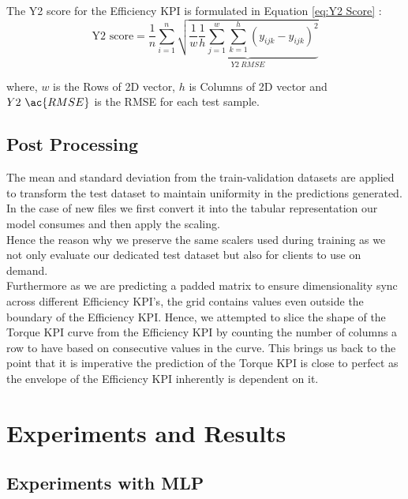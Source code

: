 \documentclass{report} %
\begin{document}
The Y2 score for the Efficiency \ac{KPI} is formulated in Equation \ref{eq:Y2 Score} :
\begin{equation}
    \text{Y2 score} = \frac{1}{n} \sum_{i=1}^{n} \underbrace{ \sqrt{\frac{1}{w} \frac{1}{h} \sum_{j=1}^{w} \sum_{k=1}^{h} (y_{ijk} - \hat{y}_{ijk})^2}}_{Y2\ RMSE}
    \label{eq:Y2 Score}
\end{equation}
    
where, \(w\) is the Rows of \ac{2D} vector, \(h\) is Columns of \ac{2D} vector and \(Y2\ \ac{RMSE}\) is the \ac{RMSE} for each test sample.

\section{Post Processing}\label{sec:Post Processing}

The mean and standard deviation from the train-validation datasets are applied to transform the test dataset to maintain uniformity in the predictions generated.
In the case of new files we first convert it into the tabular representation our model consumes and then apply the scaling.\\
Hence the reason why we preserve the same scalers used during training as we not only evaluate our dedicated test dataset but also for clients to use on demand. \\

Furthermore as we are predicting a padded matrix to ensure dimensionality sync across different Efficiency \ac{KPI}'s, the grid contains values even outside the boundary of the Efficiency \ac{KPI}.
Hence, we attempted to slice the shape of the Torque \ac{KPI} curve from the Efficiency \ac{KPI} by counting the number of columns a row to have based on consecutive values in the curve.
This brings us back to the point that it is imperative the prediction of the Torque \ac{KPI} is close to perfect as the envelope of the Efficiency \ac{KPI} inherently is dependent on it.

\newpage 
\newpage 

\chapter{Experiments and Results}

\section{Experiments with \ac{MLP}}\label{sec:Experiments with MLP}
\end{document}
